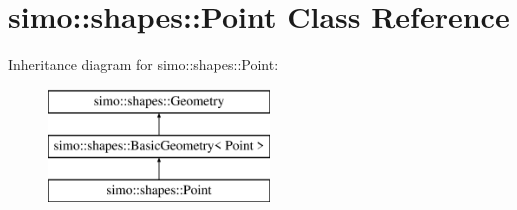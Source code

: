 \hypertarget{classsimo_1_1shapes_1_1_point}{\section{simo\-:\-:shapes\-:\-:Point Class Reference}
\label{classsimo_1_1shapes_1_1_point}
}
Inheritance diagram for simo\-:\-:shapes\-:\-:Point\-:\begin{figure}[H]
\begin{center}
\leavevmode
\includegraphics[height=3.000000cm]{classsimo_1_1shapes_1_1_point}
\end{center}
\end{figure}
